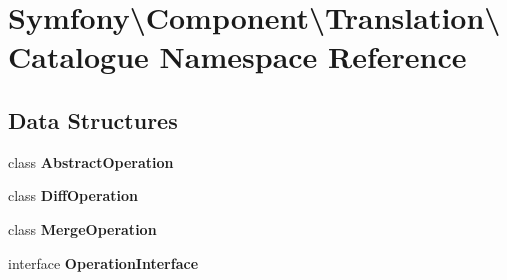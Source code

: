 \section{Symfony\textbackslash{}Component\textbackslash{}Translation\textbackslash{}Catalogue Namespace Reference}
\label{namespace_symfony_1_1_component_1_1_translation_1_1_catalogue}
\subsection*{Data Structures}
\begin{DoxyCompactItemize}
\item 
class {\bf Abstract\+Operation}
\item 
class {\bf Diff\+Operation}
\item 
class {\bf Merge\+Operation}
\item 
interface {\bf Operation\+Interface}
\end{DoxyCompactItemize}
